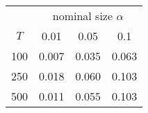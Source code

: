 % 
\begin{tabular}{cccc}
  \hline
  & \multicolumn{3}{c}{nominal size $\alpha$} \\
 $T$ & 0.01 & 0.05 & 0.1 \\
 \hline
100 & 0.007 & 0.035 & 0.063 \\ 
  250 & 0.018 & 0.060 & 0.103 \\ 
  500 & 0.011 & 0.055 & 0.103 \\ 
   \hline
\end{tabular}
